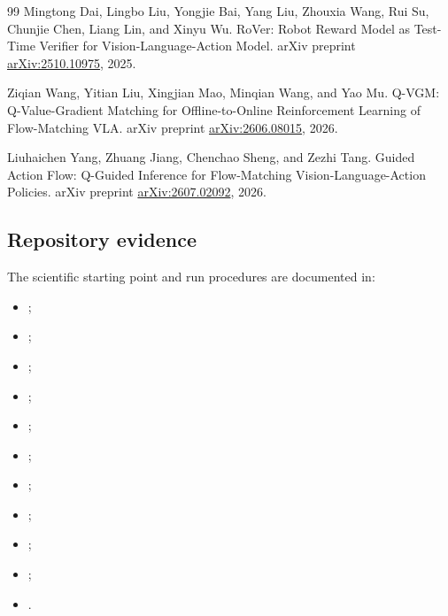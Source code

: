 \begin{thebibliography}{99}
Mingtong Dai, Lingbo Liu, Yongjie Bai, Yang Liu, Zhouxia Wang, Rui Su, Chunjie Chen, Liang Lin, and Xinyu Wu.
\newblock RoVer: Robot Reward Model as Test-Time Verifier for Vision-Language-Action Model.
\newblock arXiv preprint \href{https://arxiv.org/abs/2510.10975}{arXiv:2510.10975}, 2025.

Ziqian Wang, Yitian Liu, Xingjian Mao, Minqian Wang, and Yao Mu.
\newblock Q-VGM: Q-Value-Gradient Matching for Offline-to-Online Reinforcement Learning of Flow-Matching VLA.
\newblock arXiv preprint \href{https://arxiv.org/abs/2606.08015}{arXiv:2606.08015}, 2026.

Liuhaichen Yang, Zhuang Jiang, Chenchao Sheng, and Zezhi Tang.
\newblock Guided Action Flow: Q-Guided Inference for Flow-Matching Vision-Language-Action Policies.
\newblock arXiv preprint \href{https://arxiv.org/abs/2607.02092}{arXiv:2607.02092}, 2026.

\end{thebibliography}

\subsection{Repository evidence}

The scientific starting point and run procedures are documented in:
\begin{itemize}
  \item {};
  \item {};
  \item {};
  \item {};
  \item {};
  \item {};
  \item {};
  \item {};
  \item {};
  \item {};
  \item {}.
\end{itemize}

\enlargethispage{4\baselineskip}
\endgroup
